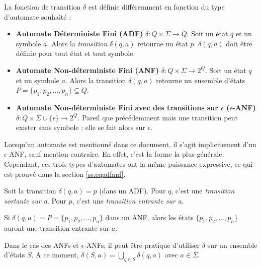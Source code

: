 La fonction de transition $\delta$ est définie différemment en fonction du type d'automate souhaité :
\begin{itemize}
  \item \textbf{Automate Déterministe Fini (ADF)} $\delta : Q \times \Sigma \rightarrow Q$. Soit un état $q$ et un symbole $a$. Alors la \emph{transition} $\delta(q,a)$ retourne un état $p$. $\delta(q,a)$ doit être définie pour tout état et tout symbole.
  \item \textbf{Automate Non-déterministe Fini (ANF)} $\delta : Q \times \Sigma \rightarrow 2^Q$. Soit un état $q$ et un symbole $a$. Alors la transition $\delta(q,a)$ retourne un ensemble d'états $P=\{p_1,p_2,\dots,p_n\}\subseteq Q$.
  \item \textbf{Automate Non-déterministe Fini avec des transitions sur $\epsilon$ ($\epsilon$-ANF)} $\delta : Q \times \Sigma \cup \{\epsilon\} \rightarrow 2^Q$. Pareil que précédemment mais une transition peut exister sans symbole : elle se fait alors sur $\epsilon$.
\end{itemize}

Lorsqu'un automate est mentionné dans ce document, il s'agit implicitement d'un $\epsilon$-ANF, sauf mention contraire. En effet, c'est la forme la plus générale. Cependant, ces trois types d'automates ont la même puissance expressive, ce qui est prouvé dans la section \ref{ss:eqadfanf}.

Soit la transition $\delta(q,a)=p$ (dans un ADF). Pour $q$, c'est une \emph{transition sortante sur a}. Pour $p$, c'est une \emph{transition entrante sur a}.

Si $\delta(q,a)=P=\{p_1,p_2,\dots,p_n\}$ dans un ANF, alors les états $\{p_1,p_2,\dots,p_n\}$ auront une transition entrante sur $a$.

Dans le cas des ANFs et $\epsilon$-ANFs, il peut être pratique d'utiliser $\delta$ sur un ensemble d'états $S$. A ce moment, $\delta(S,a)=\bigcup_{q\in S}\delta(q,a)$ avec $a\in \Sigma$.




